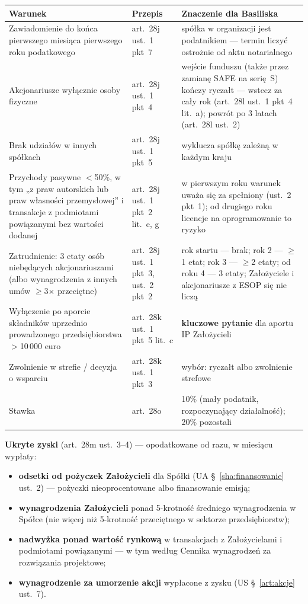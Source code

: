 \documentclass[11pt,a4paper]{report}
\newcommand{\US}[1]{US §~#1}
\newcommand{\UA}[1]{UA §~#1}
\begin{document}
\begin{center}
\small
\begin{tabularx}{\linewidth}{@{}>{\raggedright\arraybackslash}p{4.4cm} >{\raggedright\arraybackslash}p{2.2cm} X@{}}
\toprule
\textbf{Warunek} & \textbf{Przepis} & \textbf{Znaczenie dla Basiliska} \\
\midrule
Zawiadomienie do końca pierwszego miesiąca pierwszego roku podatkowego & art.~28j ust.~1 pkt~7 & spółka w organizacji jest podatnikiem --- termin liczyć ostrożnie od aktu notarialnego \\
Akcjonariusze wyłącznie osoby fizyczne & art.~28j ust.~1 pkt~4 & wejście funduszu (także przez zamianę SAFE na serię~S) kończy ryczałt --- wstecz za cały rok (art.~28l ust.~1 pkt~4 lit.~a); powrót po 3 latach (art.~28l ust.~2) \\
Brak udziałów w innych spółkach & art.~28j ust.~1 pkt~5 & wyklucza spółkę zależną w każdym kraju \\
Przychody pasywne $<$50\%, w tym „z praw autorskich lub praw własności przemysłowej” i transakcje z podmiotami powiązanymi bez wartości dodanej & art.~28j ust.~1 pkt~2 lit.~e, g & w pierwszym roku warunek uważa się za spełniony (ust.~2 pkt~1); od drugiego roku licencje na oprogramowanie to ryzyko \\
Zatrudnienie: 3 etaty osób niebędących akcjonariuszami (albo wynagrodzenia z innych umów $\geq$3$\times$ przeciętne) & art.~28j ust.~1 pkt~3, ust.~2 pkt~2 & rok startu --- brak; rok 2 --- $\geq$1 etat; rok 3 --- $\geq$2 etaty; od roku 4 --- 3 etaty; Założyciele i akcjonariusze z ESOP się nie liczą \\
Wyłączenie po aporcie składników uprzednio prowadzonego przedsiębiorstwa $>$10\,000 euro & art.~28k ust.~1 pkt~5 lit.~c & \textbf{kluczowe pytanie} dla aportu IP Założycieli \\
Zwolnienie w strefie / decyzja o wsparciu & art.~28k ust.~1 pkt~3 & wybór: ryczałt albo zwolnienie strefowe \\
Stawka & art.~28o & 10\% (mały podatnik, rozpoczynający działalność); 20\% pozostali \\
\bottomrule
\end{tabularx}
\end{center}

\textbf{Ukryte zyski} (art.~28m ust.~3--4) --- opodatkowane od razu, w miesiącu wypłaty:
\begin{itemize}
  \item \textbf{odsetki od pożyczek Założycieli} dla Spółki (\UA{\ref{sha:finansowanie} ust.~2}) --- pożyczki nieoprocentowane albo finansowanie emisją;
  \item \textbf{wynagrodzenia Założycieli} ponad 5-krotność średniego wynagrodzenia w Spółce (nie więcej niż 5-krotność przeciętnego w sektorze przedsiębiorstw);
  \item \textbf{nadwyżka ponad wartość rynkową} w transakcjach z Założycielami i podmiotami powiązanymi --- w tym według Cennika wynagrodzeń za rozwiązania projektowe;
  \item \textbf{wynagrodzenie za umorzenie akcji} wypłacone z zysku (\US{\ref{art:akcje} ust.~7}).
\end{itemize}
\end{document}
